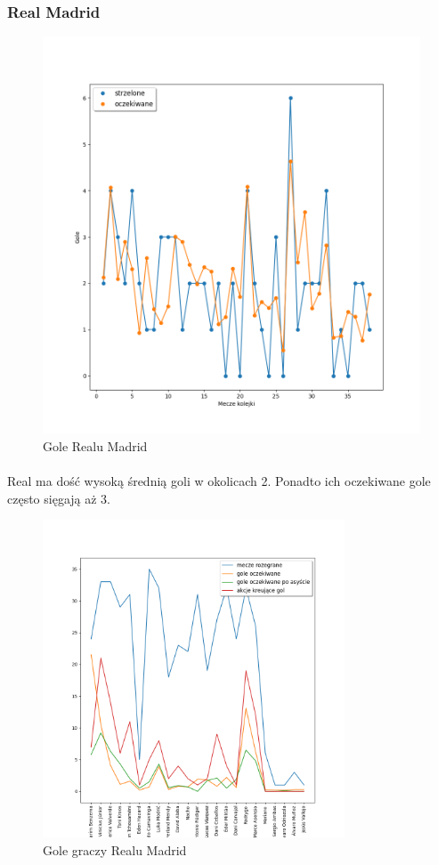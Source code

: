 \documentclass[12pt, letterpaper]{article}
\begin{document}
\subsubsection{Real Madrid}
\begin{figure}[ht]
    \centering
    \includegraphics[width=.8\textwidth]{images/Real_goals.png}
    \caption{Gole Realu Madrid}
    \label{fig:enter-label}
\end{figure}
\paragraph{} Real ma dość wysoką średnią goli w okolicach 2. Ponadto ich oczekiwane gole często sięgają aż 3.
\pagebreak
\begin{figure}[ht]
    \centering
    \includegraphics[width=0.8\textwidth]{images/Real_players_goals.png}
    \caption{Gole graczy Realu Madrid}
    \label{fig:enter-label}
\end{figure}
\end{document}

